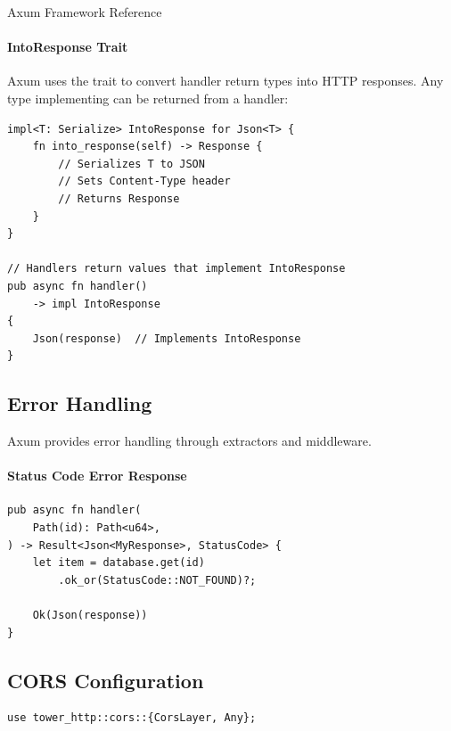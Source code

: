 \begin{deepdive}{Axum Framework Reference}
\paragraph{IntoResponse Trait}

Axum uses the  trait to convert handler return types into HTTP responses. Any type implementing  can be returned from a handler:

\begin{listing}[H]
\caption{IntoResponse trait implementation}
\label{lst:axum-intoresponse}
\begin{verbatim}
impl<T: Serialize> IntoResponse for Json<T> {
    fn into_response(self) -> Response {
        // Serializes T to JSON
        // Sets Content-Type header
        // Returns Response
    }
}

// Handlers return values that implement IntoResponse
pub async fn handler()
    -> impl IntoResponse
{
    Json(response)  // Implements IntoResponse
}
\end{verbatim}
\end{listing}

\subsection{Error Handling}

Axum provides error handling through extractors and middleware.

\paragraph{Status Code Error Response}

\begin{listing}[H]
\caption{Error response pattern}
\label{lst:axum-error-handling}
\begin{verbatim}
pub async fn handler(
    Path(id): Path<u64>,
) -> Result<Json<MyResponse>, StatusCode> {
    let item = database.get(id)
        .ok_or(StatusCode::NOT_FOUND)?;

    Ok(Json(response))
}
\end{verbatim}
\end{listing}

\subsection{CORS Configuration}

\begin{listing}[H]
\caption{Axum CORS setup}
\label{lst:axum-cors}
\begin{verbatim}
use tower_http::cors::{CorsLayer, Any};


\end{verbatim}
\end{listing}
\end{deepdive}

